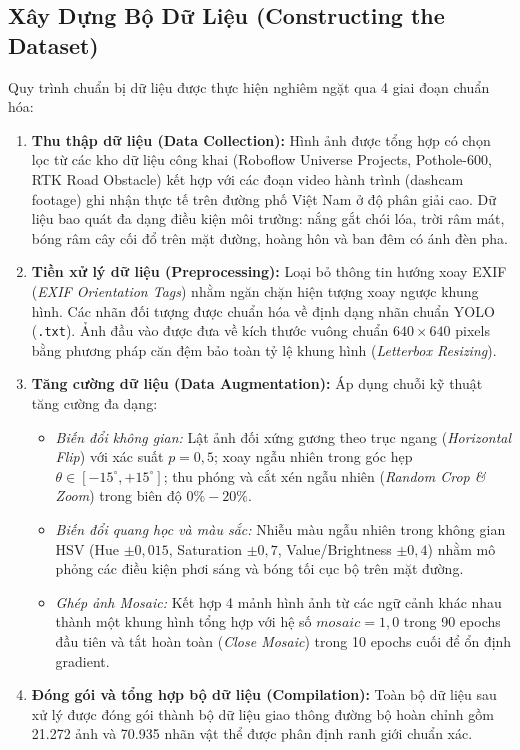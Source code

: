 \subsection{Xây Dựng Bộ Dữ Liệu (Constructing the Dataset)}
\label{subsec:xay_dung_du_lieu}

Quy trình chuẩn bị dữ liệu được thực hiện nghiêm ngặt qua 4 giai đoạn chuẩn hóa:
\begin{enumerate}
    \item \textbf{Thu thập dữ liệu (Data Collection):} Hình ảnh được tổng hợp có chọn lọc từ các kho dữ liệu công khai (Roboflow Universe Projects, Pothole-600, RTK Road Obstacle) kết hợp với các đoạn video hành trình (dashcam footage) ghi nhận thực tế trên đường phố Việt Nam ở độ phân giải cao. Dữ liệu bao quát đa dạng điều kiện môi trường: nắng gắt chói lóa, trời râm mát, bóng râm cây cối đổ trên mặt đường, hoàng hôn và ban đêm có ánh đèn pha.
    \item \textbf{Tiền xử lý dữ liệu (Preprocessing):} Loại bỏ thông tin hướng xoay EXIF (\textit{EXIF Orientation Tags}) nhằm ngăn chặn hiện tượng xoay ngược khung hình. Các nhãn đối tượng được chuẩn hóa về định dạng nhãn chuẩn YOLO (\texttt{.txt}). Ảnh đầu vào được đưa về kích thước vuông chuẩn $640 \times 640$ pixels bằng phương pháp căn đệm bảo toàn tỷ lệ khung hình (\textit{Letterbox Resizing}).
    \item \textbf{Tăng cường dữ liệu (Data Augmentation):} Áp dụng chuỗi kỹ thuật tăng cường đa dạng:
    \begin{itemize}
        \item \textit{Biến đổi không gian:} Lật ảnh đối xứng gương theo trục ngang (\textit{Horizontal Flip}) với xác suất $p = 0,5$; xoay ngẫu nhiên trong góc hẹp $\theta \in [-15^\circ, +15^\circ]$; thu phóng và cắt xén ngẫu nhiên (\textit{Random Crop \& Zoom}) trong biên độ $0\% - 20\%$.
        \item \textit{Biến đổi quang học và màu sắc:} Nhiễu màu ngẫu nhiên trong không gian HSV (Hue $\pm 0,015$, Saturation $\pm 0,7$, Value/Brightness $\pm 0,4$) nhằm mô phỏng các điều kiện phơi sáng và bóng tối cục bộ trên mặt đường.
        \item \textit{Ghép ảnh Mosaic:} Kết hợp 4 mảnh hình ảnh từ các ngữ cảnh khác nhau thành một khung hình tổng hợp với hệ số $mosaic = 1,0$ trong 90 epochs đầu tiên và tắt hoàn toàn (\textit{Close Mosaic}) trong 10 epochs cuối để ổn định gradient.
    \end{itemize}
    \item \textbf{Đóng gói và tổng hợp bộ dữ liệu (Compilation):} Toàn bộ dữ liệu sau xử lý được đóng gói thành bộ dữ liệu giao thông đường bộ hoàn chỉnh gồm 21.272 ảnh và 70.935 nhãn vật thể được phân định ranh giới chuẩn xác.
\end{enumerate}

